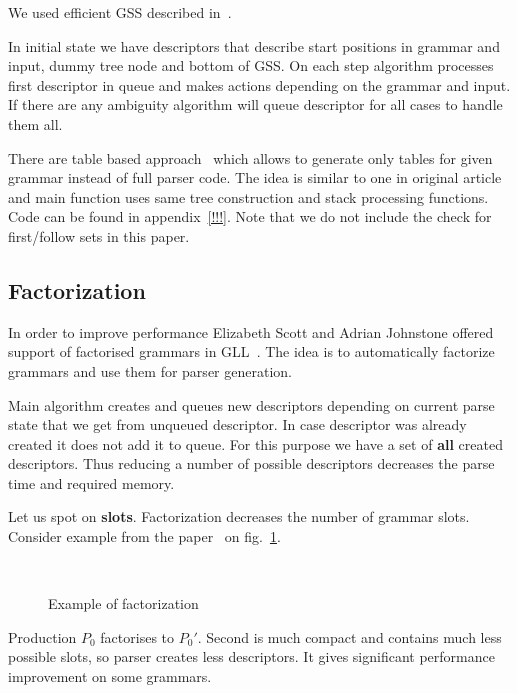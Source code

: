 \documentclass[runningheads,a4paper]{llncs}
\begin{document}
We used efficient GSS described in~\cite{afroozeh2015faster}.

In initial state we have descriptors that describe start positions in grammar and input, dummy tree node and bottom of GSS.
On each step algorithm processes first descriptor in queue and makes actions depending on the grammar and input.
If there are any ambiguity algorithm will queue descriptor for all cases to handle them all. 

There are table based approach~\cite{ragozina} which allows to generate only tables for given grammar instead of full parser code.
The idea is similar to one in original article and main function uses same tree construction and stack processing functions.
Code can be found in appendix~\ref{!!!}. Note that we do not include the check for first/follow sets in this paper.

\subsection{Factorization}%

In order to improve performance Elizabeth Scott and Adrian Johnstone offered support of factorised grammars in GLL~\cite{scott2016structuring}. 
The idea is to automatically factorize grammars and use them for parser generation. 

Main algorithm creates and queues new descriptors depending on current parse state that we get from unqueued descriptor. 
In case descriptor was already created it does not add it to queue. For this purpose we have a set of
\textbf{all} created descriptors. Thus reducing a number of possible descriptors decreases the parse time
and required memory.

Let us spot on \textbf{slots}. Factorization decreases the number of grammar slots. 
Consider example from the paper~\cite{scott2016structuring} on fig.~\ref{fig:ExampleOfFactorization}.

\begin{figure}
    \centering
    ~
    \caption{Example of factorization}
    \label{fig:ExampleOfFactorization}
\end{figure}
Production $P_0$ factorises to $P_0'$.
Second is much compact and contains much less possible slots, 
so parser creates less descriptors.
It gives significant performance improvement on some grammars.
\end{document}

